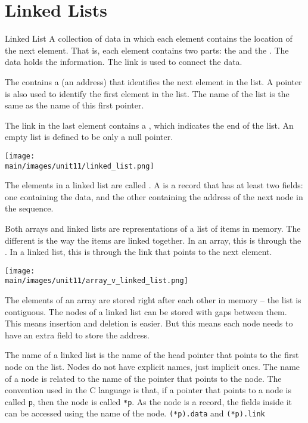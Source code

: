 \documentclass[\main/notes.tex]{subfiles}
\begin{document}
		\section{Linked Lists}
			\begin{definition}{Linked List}
				A collection of data in which each element contains the location of the next element. That is, each element contains two parts: the  and the . The data holds the information. The link is used to connect the data.

				The  contains a  (an address) that identifies the next element in the list. A pointer is also used to identify the first element in the list. The name of the list is the same as the name of this first pointer.

				The link in the last element contains a , which indicates the end of the list. An empty list is defined to be only a null pointer.

				\begin{center}
					\texttt{[image: \\main/images/unit11/linked\_list.png]}
				\end{center}

				The elements in a linked list are called . A  is a record that has at least two fields: one containing the data, and the other containing the address of the next node in the sequence.
			\end{definition}
			Both arrays and linked lists are representations of a list of items in memory. The different is the way the items are linked together. In an array, this is through the . In a linked list, this is through the link that points to the next element.
			\begin{center}
				\texttt{[image: \\main/images/unit11/array\_v\_linked\_list.png]}
			\end{center}
			The elements of an array are stored right after each other in memory -- the list is contiguous. The nodes of a linked list can be stored with gaps between them. This means insertion and deletion is easier. But this means each node needs to have an extra field to store the address.

			The name of a linked list is the name of the head pointer that points to the first node on the list. Nodes do not have explicit names, just implicit ones. The name of a node is related to the name of the pointer that points to the node. The convention used in the C language is that, if a pointer that points to a node is called \texttt{p}, then the node is called \texttt{*p}. As the node is a record, the fields inside it can be accessed using the name of the node. \texttt{(*p).data} and \texttt{(*p).link}
\end{document}
